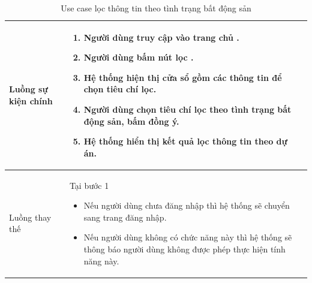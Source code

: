 \documentclass[12pt,a4paper]{article}
\begin{document}
\begin{table}[H]
\begin{tabular}{|p{3.5cm}|p{11.5cm}|c|}
            Luồng sự kiện chính & \vspace{-.8cm}\begin{enumerate}
                                                    \item Người dùng truy cập vào trang chủ .
                                                    \item Người dùng bấm nút lọc .
                                                    \item Hệ thống hiện thị cửa sổ gồm các thông tin để chọn tiêu chí lọc.
                                                    \item Người dùng chọn tiêu chí lọc theo tình trạng bất động sản, bấm đồng ý.
                                                    \item Hệ thống hiển thị kết quả lọc thông tin theo dự án.
            \end{enumerate}
            \\
            \hline
            Luồng thay thế & Tại bước 1\newline
            \vspace{-.8cm}\begin{itemize}
                              \item Nếu người dùng chưa đăng nhập thì hệ thống sẽ chuyển sang trang đăng nhập.
                              \item Nếu người dùng không có chức năng này thì hệ thống sẽ thông báo người dùng không được phép thực hiện tính năng này.
            \end{itemize}

            \\ \hline
        \end{tabular}
        \caption{Use case lọc thông tin theo tình trạng bất động sản}

    \end{table}


\end{document}
